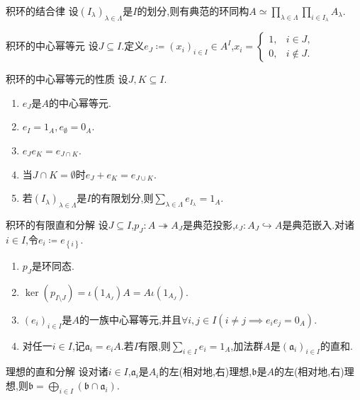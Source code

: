 \begin{proposition}{积环的结合律}{}
	设$\left(I_{\lambda}\right)_{\lambda\in\Lambda}$是$I$的划分,则有典范的环同构$A\simeq\prod\limits_{\lambda\in\Lambda}\prod\limits_{i\in I_{\lambda}}A_{\lambda}$.
\end{proposition}

\begin{definition}{积环的中心幂等元}{}
	设$J\subseteq I$.定义$e_{J}\coloneq\left(x_{i}\right)_{i\in I}\in A^{I}$,$x_{i}=
	\begin{cases}
		1,&i\in J,\\
		0,&i\notin J.
	\end{cases}$
\end{definition}

\begin{proposition}{积环的中心幂等元的性质}{}
	设$J,K\subseteq I$.
	\begin{enumerate}
		\item $e_{J}$是$A$的中心幂等元.
		\item $e_{I}=1_{A},e_{\emptyset}=0_{A}$.
		\item $e_{J}e_{K}=e_{J\cap K}$.
		\item 当$J\cap K=\emptyset$时$e_{J}+e_{K}=e_{J\cup K}$.
		\item 若$\left(I_{\lambda}\right)_{\lambda\in\Lambda}$是$I$的有限划分,则$\sum\limits_{\lambda\in\Lambda}e_{I_{\lambda}}=1_{A}$.
	\end{enumerate}
\end{proposition}

\begin{proposition}{积环的有限直和分解}{}
	设$J\subseteq I$,$p_{J}:A\twoheadrightarrow A_{J}$是典范投影,$\iota_{J}:A_{J}\hookrightarrow A$是典范嵌入.对诸$i\in I$,令$e_{i}\coloneq e_{\left\{i\right\}}$.
	\begin{enumerate}
		\item $p_{J}$是环同态.
		\item $\ker\left(p_{I\setminus J}\right)=\iota\left(1_{A_{J}}\right)A=A\iota\left(1_{A_{J}}\right)$.
		\item $\left(e_{i}\right)_{i\in I}$是$A$的一族中心幂等元,并且$\forall i,j\in I\left(i\neq j\implies e_{i}e_{j}=0_{A}\right)$.
		\item 对任一$i\in I$,记$\mathfrak{a}_{i}=e_{i}A$.若$I$有限,则$\sum\limits_{i\in I}e_{i}=1_{A}$,加法群$A$是$\left(\mathfrak{a}_{i}\right)_{i\in I}$的直和.
	\end{enumerate}
\end{proposition}

\begin{proposition}{理想的直和分解}{}
	设对诸$i\in I$,$\mathfrak{a}_{i}$是$A_{i}$的左(相对地,右)理想,$\mathfrak{b}$是$A$的左(相对地,右)理想,则$\mathfrak{b}=\bigoplus\limits_{i\in I}\left(\mathfrak{b}\cap\mathfrak{a}_{i}\right)$.
\end{proposition}









